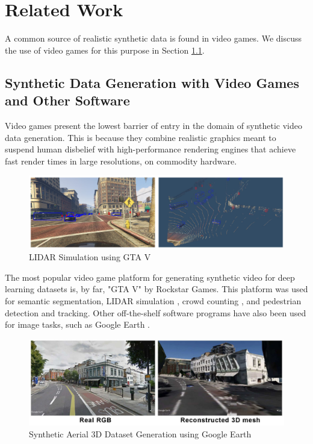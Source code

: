 \chapter{Related Work}
\label{chapter:related}

A common source of realistic synthetic data is found in video games. We discuss the use of video games for this purpose in Section \ref{sec:video-games}.

\section{Synthetic Data Generation with Video Games and Other Software}
\label{sec:video-games}


Video games present the lowest barrier of entry in the domain of synthetic video data generation. This is because they combine realistic graphics meant to suspend human disbelief with high-performance rendering engines that achieve fast render times in large resolutions, on commodity hardware.

\begin{figure}[H]
    \centering
    \includegraphics[width=\textwidth]{src/img/reated-pics/gta5-poza.jpg}
    \caption{LIDAR Simulation using GTA V\cite{hurl2019precise}}
    \label{fig:relatex-example-gta5}
\end{figure}

The most popular video game platform for generating synthetic video for deep learning datasets is, by far, "GTA V" by Rockstar Games. This platform was used for semantic segmentation\cite{richter2016playing}, LIDAR simulation \cite{hurl2019precise}, crowd counting \cite{wang2019learning}, and pedestrian detection and tracking\cite{Fabbri_2021_ICCV}. Other off-the-shelf software programs have also been used for image tasks, such as Google Earth \cite{marcu2018safeuav}.


\begin{figure}[H]
    \centering
    \includegraphics[width=\textwidth]{src/img/reated-pics/goog-earth.jpg}
    \caption{Synthetic Aerial 3D Dataset Generation using Google Earth\cite{marcu2018safeuav}}
    \label{fig:relatex-example-gta5}
\end{figure}


